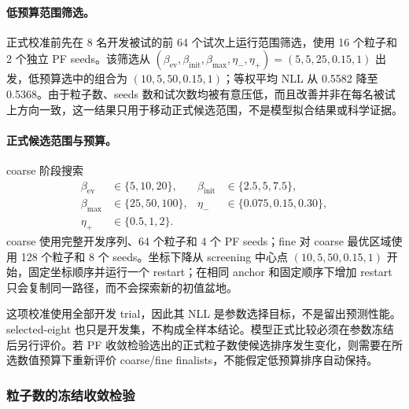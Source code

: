 \paragraph{低预算范围筛选。}
正式校准前先在 8 名开发被试的前 64 个试次上运行范围筛选，使用 16 个粒子和 2 个独立 PF seeds。该筛选从
$(\beta_{\mathrm{ev}},\beta_{\mathrm{init}},\beta_{\max},\eta_-,\eta_+)
=(5,5,25,0.15,1)$ 出发，低预算选中的组合为
$(10,5,50,0.15,1)$；等权平均 NLL 从 0.5582 降至 0.5368。由于粒子数、seeds 数和试次数均被有意压低，而且改善并非在每名被试上方向一致，这一结果只用于移动正式候选范围，不是模型拟合结果或科学证据。

\paragraph{正式候选范围与预算。}
coarse 阶段搜索
\begin{align}
\beta_{\mathrm{ev}}&\in\{5,10,20\},
&
\beta_{\mathrm{init}}&\in\{2.5,5,7.5\},
\nonumber\\
\beta_{\max}&\in\{25,50,100\},
&
\eta_-&\in\{0.075,0.15,0.30\},
\nonumber\\
\eta_+&\in\{0.5,1,2\}.
\label{eq:m0815-beta-grid}
\end{align}
coarse 使用完整开发序列、64 个粒子和 4 个 PF seeds；fine 对 coarse 最优区域使用 128 个粒子和 8 个 seeds。坐标下降从 screening 中心点
$(10,5,50,0.15,1)$ 开始，固定坐标顺序并运行一个 restart；在相同 anchor 和固定顺序下增加 restart 只会复制同一路径，而不会探索新的初值盆地。

这项校准使用全部开发 trial，因此其 NLL 是参数选择目标，不是留出预测性能。selected-eight 也只是开发集，不构成全样本结论。模型正式比较必须在参数冻结后另行评价。若 PF 收敛检验选出的正式粒子数使候选排序发生变化，则需要在所选数值预算下重新评价 coarse/fine finalists，不能假定低预算排序自动保持。


\subsubsection{粒子数的冻结收敛检验}

